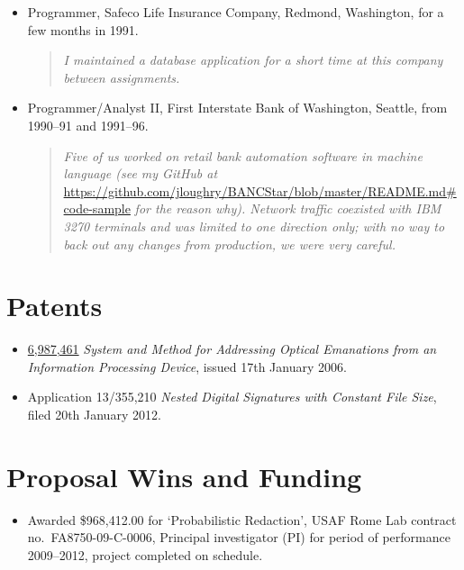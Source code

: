 \documentclass[letterpaper]{article}
\begin{document}
\begin{itemize}
	\item Programmer, Safeco Life Insurance Company, Redmond, Washington, for a few months
		in 1991.
		\begin{quote}\vspace{-2mm}
			\emph{I maintained a database application for a short time at this company
				between assignments.}
		\end{quote}

	\item Programmer/Analyst II, First Interstate Bank of Washington, Seattle,
		from 1990--91 and 1991--96.
		\begin{quote}\vspace{-2mm}
			\emph{Five of us worked on retail bank automation software in machine language
			(see my GitHub at}
			\url{https://github.com/jloughry/BANCStar/blob/master/README.md#code-sample}
			\emph{for the reason why).  Network traffic coexisted with IBM 3270 terminals
			and was limited to one direction only; with no way to back out any changes from
			production, we were very careful.}
		\end{quote}
\end{itemize}

\vspace{-8mm}
\section*{Patents}

\begin{itemize}
    \item \href{http://www.google.com/patents/US6987461}{6,987,461} \emph{System and Method
		for Addressing Optical Emanations from an Information Processing Device}, issued
		17th January 2006.

	\item Application 13/355,210 \emph{Nested Digital Signatures with Constant File Size},
		filed 20th January 2012.
\end{itemize}

\vspace{-6mm}
\section*{Proposal Wins and Funding}

\begin{itemize}
	\item Awarded \$968,412.00 for `Probabilistic Redaction', USAF Rome Lab contract
	no.\ FA8750-09-C-0006, Principal investigator (PI) for period of performance
	2009--2012, project completed on schedule.
\end{itemize}
\end{document}
